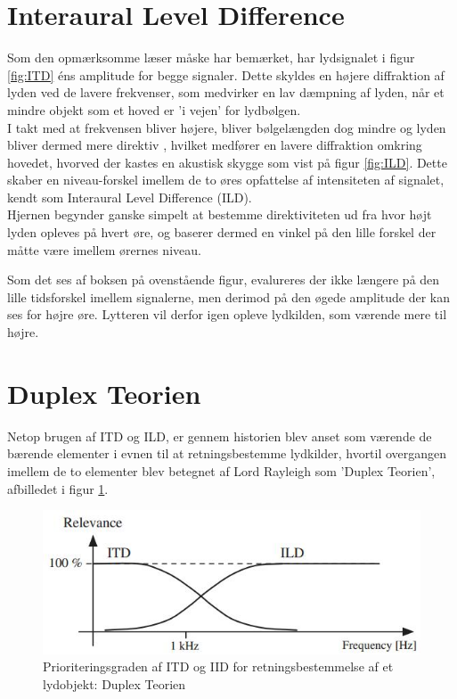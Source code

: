 \section{Interaural Level Difference}
Som den opmærksomme læser måske har bemærket, har lydsignalet i figur \ref{fig:ITD} éns amplitude for begge signaler. Dette skyldes en højere diffraktion af lyden ved de lavere frekvenser, som medvirker en lav dæmpning af lyden, når et mindre objekt som et hoved er 'i vejen' for lydbølgen. \\
I takt med at frekvensen bliver højere, bliver bølgelængden dog mindre og lyden bliver dermed mere direktiv \cite{Elektroakustik}, hvilket medfører en lavere diffraktion omkring hovedet, hvorved der kastes en akustisk skygge som vist på figur \ref{fig:ILD}. \newline
Dette skaber en niveau-forskel imellem de to øres opfattelse af intensiteten af signalet, kendt som Interaural Level Difference (ILD).\\
Hjernen begynder ganske simpelt at bestemme direktiviteten ud fra hvor højt lyden opleves på hvert øre, og baserer dermed en vinkel på den lille forskel der måtte være imellem ørernes niveau. 

Som det ses af boksen på ovenstående figur, evalureres der ikke længere på den lille tidsforskel imellem signalerne, men derimod på den øgede amplitude der kan ses for højre øre. Lytteren vil derfor igen opleve lydkilden, som værende mere til højre.

\section{Duplex Teorien}
Netop brugen af ITD og ILD, er gennem historien blev anset som værende de bærende elementer i evnen til at retningsbestemme lydkilder, hvortil overgangen imellem de to elementer blev betegnet af Lord Rayleigh som 'Duplex Teorien', afbilledet i figur \ref{fig:DuplexTeorien}\cite{SpatialBook}.

\begin{figure}[h!]
	\centering
	\includegraphics[width=0.7\linewidth]{All_Pics/ITDIID}
	\caption{Prioriteringsgraden af ITD og IID for retningsbestemmelse af et lydobjekt: Duplex Teorien \cite{SpatialBook}}
	\label{fig:DuplexTeorien}
\end{figure}

